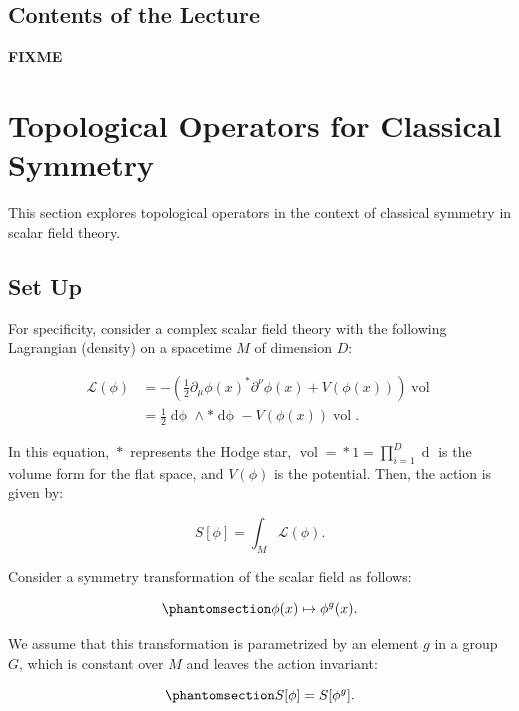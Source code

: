 \documentclass[11pt,toc=bibliography]{scrbook}
\DeclareMathOperator{\vol}{vol}
\newcommand{\stdim}{D}
\numberwithin{equation}{section}
\DeclareMathOperator{\vol}{vol}
\newcommand{\stdim}{D}
\begin{document}
\section{Contents of the Lecture}\label{contents-of-the-lecture}

\textbf{FIXME}


\chapter{Topological Operators for Classical Symmetry}\label{sec-scalar}

This section explores topological operators in the context of classical
symmetry in scalar field theory.

\section{Set Up}\label{set-up}

For specificity, consider a complex scalar field theory with the
following Lagrangian (density) on a spacetime \(M\) of dimension
\(\stdim\):

\[
\begin{aligned}
\mathcal{L}(\phi) &=  - \left(\frac12 \partial_\mu \phi(x)^* \partial^\nu \phi(x) + V(\phi(x))\right)\vol\\
&= \frac{1}{2} \mathop{d\phi} \wedge *\mathop{d\phi} - V(\phi(x))\vol.
\end{aligned}
\]

In this equation, \(\mathop{*}\) represents the Hodge star,
\(\vol = \mathop{*} 1 = \prod_{i=1}^{\stdim} \mathop{dx_i}\) is the
volume form for the flat space, and \(V(\phi)\) is the potential. Then,
the action is given by:

\[
S[\phi] = \int_{M}\mathcal{L}(\phi).
\]

Consider a symmetry transformation of the scalar field as follows:

\begin{equation}\phantomsection\label{eq-scalar-transf}{
\phi(x) \mapsto \phi^g(x).
}\end{equation}

We assume that this transformation is parametrized by an element \(g\)
in a group \(G\), which is constant over \(M\) and leaves the action
invariant:

\begin{equation}\phantomsection\label{eq-action-inv}{
S[\phi]=S[\phi^g].
}\end{equation}
\end{document}
